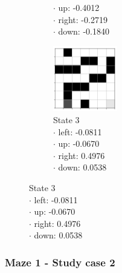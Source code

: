 \documentclass[a4paper]{article}    %
\begin{document}
\begin{figure}[H]
\begin{subfigure}{0.24\textwidth}
{            \hspace*{5mm} $\boldsymbol{\cdot}$ up:    -0.4012 \\
            \hspace*{5mm} $\boldsymbol{\cdot}$ right: -0.2719 \\
            \hspace*{5mm} $\boldsymbol{\cdot}$ down:  -0.1840 }
        \label{fig:maze1-case1-state2}
    \end{subfigure}
    \hfill
    \begin{subfigure}{0.24\textwidth}
        \centering
        \includegraphics[width=2.8cm]{maze1-case1-state3}
        \caption{State 3 \\
            \scriptsize
            \hspace*{5mm} $\boldsymbol{\cdot}$ left: -0.0811 \\
            \hspace*{5mm} $\boldsymbol{\cdot}$ up:   -0.0670 \\
            \hspace*{5mm} $\boldsymbol{\cdot}$ right: 0.4976 \\
            \hspace*{5mm} $\boldsymbol{\cdot}$ down:  0.0538 }
        \label{fig:maze1-case1-state3}
    \end{subfigure}
\end{figure}

\subsubsection{Maze 1 - Study case 2}
\end{document}

